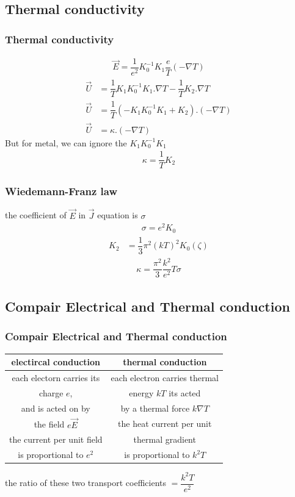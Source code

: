 \documentclass{beamer}
\begin{document}
\subsection{Thermal conductivity}
\begin{frame}
\frametitle{Thermal conductivity}
\pause
\begin{align*}
\vec{E} = \dfrac{1}{e^2} K^{-1}_{0} K_1 \dfrac{e}{T} (-\nabla T)
\end{align*}
\pause
\begin{align*}
\vec{U} &= \dfrac{1}{T} K_1 K^{-1}_{0} K_1 . \nabla T - \dfrac{1}{T} K_2 . \nabla T \\
\vec{U} &= \dfrac{1}{T} (-K_1 K^{-1}_{0} K_1 + K_2).(-\nabla T) \\
\vec{U} &= \kappa .(-\nabla T)
\end{align*}
\pause
But for metal, we can ignore the $K_1 K^{-1}_{0} K_1$ 
\begin{align*}
\kappa = \dfrac{1}{T} K_2
\end{align*}
\end{frame}
\begin{frame}
\frametitle{Wiedemann-Franz law}
\pause
the coefficient of $\vec{E}$ in $\vec{J}$ equation is $\sigma$
\begin{align*}
\sigma = e^2 K_0
\end{align*}
\pause
\begin{align*}
K_2 &= \dfrac{1}{3}\pi^2 (kT)^2 K_0 (\zeta)
\end{align*}
\pause
\begin{align*}
\boxed{\kappa = \dfrac{\pi^2}{3} \dfrac{k^2}{e^2} T \sigma}
\end{align*}
\end{frame}
\subsection{Compair Electrical and Thermal conduction}
\begin{frame}
\frametitle{Compair Electrical and Thermal conduction}
\begin{table}
\centering
\begin{tabular}{|c|c|}
\hline
electircal conduction & thermal conduction \\
\hline
each electorn carries its & each electron carries thermal\\
charge $e$,&  energy $kT$ its acted \\
and is acted on by & by a thermal force $k \nabla T$ \\
the field $e\vec{E}$ & the heat current per unit  \\
the current per unit field &  thermal gradient \\
is proportional to $e^2$ & is proportional to $k^2 T$\\
\hline  
\end{tabular}
\end{table}
the ratio of these two transport coefficients $= \dfrac{k^2 T}{e^2}$
\end{frame}
\end{document}
